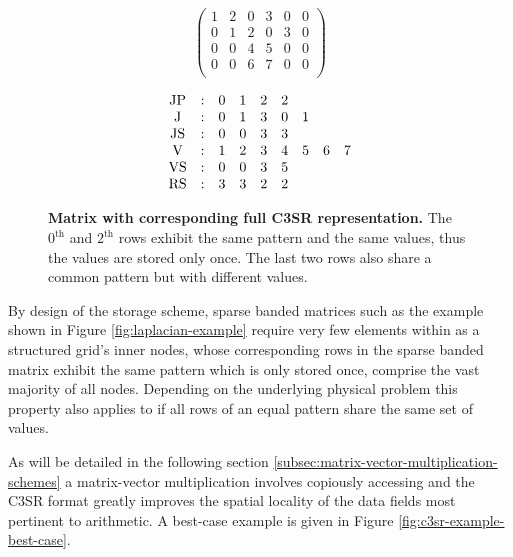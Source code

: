 \documentclass{article}
\begin{document}
    \begin{figure}[ht]
      \centering
      \begin{minipage}{0.4\textwidth}
        \centering
        $$
        \begin{pmatrix}
          1 & 2 & 0 & 3 & 0 & 0 \\
          0 & 1 & 2 & 0 & 3 & 0 \\
          0 & 0 & 4 & 5 & 0 & 0 \\
          0 & 0 & 6 & 7 & 0 & 0 \\
        \end{pmatrix}
        $$
      \end{minipage}
      \begin{minipage}{0.4\textwidth}
        \centering
        $$
        \begin{matrix}
          \JP & : & 0 & 1 & 2 & 2 &   &   &   \\
           \J & : & 0 & 1 & 3 & 0 & 1 &   &   \\
          \JS & : & 0 & 0 & 3 & 3 &   &   &   \\
           \V & : & 1 & 2 & 3 & 4 & 5 & 6 & 7 \\
          \VS & : & 0 & 0 & 3 & 5 &   &   &   \\
          \RS & : & 3 & 3 & 2 & 2 &   &   &   \\
        \end{matrix}
        $$
      \end{minipage}
      \caption[Matrix with corresponding full C3SR representation.]{\textbf{Matrix with corresponding full C3SR representation.} The $0^{\text{th}}$ and $2^{\text{th}}$ rows exhibit the same pattern and the same values, thus the values are stored only once. The last two rows also share a common pattern but with different values.}
      \label{fig:c3sr_example_full}
    \end{figure}

    By design of the storage scheme, sparse banded matrices such as the example shown in Figure \ref{fig:laplacian-example} require very few elements within \J as a structured grid's inner nodes, whose corresponding rows in the sparse banded matrix exhibit the same pattern which is only stored once, comprise the vast majority of all nodes. Depending on the underlying physical problem this property also applies to \V if all rows of an equal pattern share the same set of values. 

    As will be detailed in the following section \ref{subsec:matrix-vector-multiplication-schemes} a matrix-vector multiplication involves copiously accessing \J and \V the C3SR format greatly improves the spatial locality of the data fields most pertinent to arithmetic. A best-case example is given in Figure \ref{fig:c3sr-example-best-case}.
\end{document}
